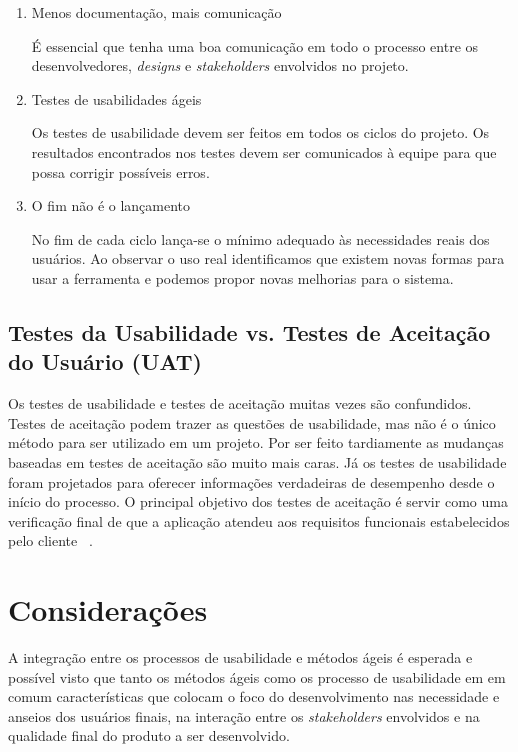 \begin{enumerate}
	
\item Menos documentação, mais comunicação

	É essencial que tenha uma boa comunicação em todo o processo entre os desenvolvedores, \emph{designs} e \textit{stakeholders} envolvidos no projeto.



\item Testes de usabilidades ágeis

	Os testes de usabilidade devem ser feitos em todos os ciclos do projeto.  Os resultados encontrados nos testes devem ser comunicados à equipe para que possa corrigir possíveis erros.

\item O fim não é o lançamento

	No fim de cada ciclo lança-se o mínimo adequado às necessidades reais dos usuários. Ao observar o uso real identificamos que existem novas formas para usar a ferramenta e podemos propor novas melhorias para o sistema. 
	
\end{enumerate}


\subsection{Testes da Usabilidade vs. Testes de Aceitação do Usuário (UAT)}


Os testes de usabilidade e testes de aceitação muitas vezes são confundidos. Testes de aceitação podem trazer as questões de usabilidade, mas não é o único método para ser utilizado em um projeto. Por ser feito tardiamente as mudanças baseadas em testes de aceitação são muito mais caras. Já os testes de usabilidade foram projetados para oferecer informações verdadeiras de desempenho desde o início do processo.  
%
O principal objetivo dos testes de aceitação é servir como uma verificação final de que a aplicação atendeu aos requisitos funcionais estabelecidos pelo cliente ~\cite{preece2007}.

\section{Considerações}

	A integração entre os processos de usabilidade e métodos ágeis é esperada e possível visto que tanto os métodos ágeis como os processo de usabilidade em em comum características que colocam o foco do desenvolvimento nas necessidade e anseios dos usuários finais, na interação entre os \textit{stakeholders} envolvidos e na qualidade final do produto a ser desenvolvido.






